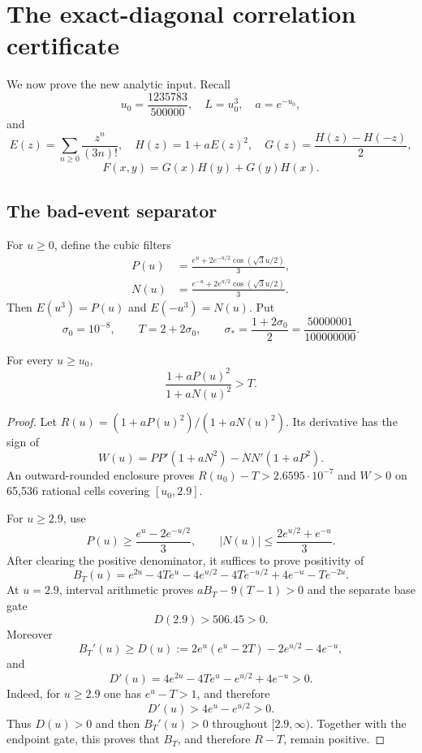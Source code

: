 \section{The exact-diagonal correlation certificate}\label{sec:exact}

We now prove the new analytic input.  Recall
\[
 u_0=\frac{1235783}{500000},\quad L=u_0^3,\quad a=e^{-u_0},
\]
and
\[
 E(z)=\sum_{n\ge0}\frac{z^n}{(3n)!},\quad
 H(z)=1+aE(z)^2,\quad G(z)=\frac{H(z)-H(-z)}2,
\]
\[
 F(x,y)=G(x)H(y)+G(y)H(x).
\]

\subsection{The bad-event separator}

For \(u\ge0\), define the cubic filters
\begin{align}
 P(u)&=\frac{e^u+2e^{-u/2}\cos(\sqrt3u/2)}3,\tag{4.1}\\
 N(u)&=\frac{e^{-u}+2e^{u/2}\cos(\sqrt3u/2)}3.\tag{4.2}
\end{align}
Then \(E(u^3)=P(u)\) and \(E(-u^3)=N(u)\).  Put
\[
 \sigma_0=10^{-8},\qquad T=2+2\sigma_0,\qquad
 \sigma_*=\frac{1+2\sigma_0}{2}=\frac{50000001}{100000000}.
 \tag{4.3}
\]

\begin{lemma}\label{lem:ratio}
For every \(u\ge u_0\),
\[
 \frac{1+aP(u)^2}{1+aN(u)^2}>T.
 \tag{4.4}
\]
\end{lemma}

\begin{proof}
Let \(R(u)=(1+aP(u)^2)/(1+aN(u)^2)\).  Its derivative has the sign of
\[
 W(u)=PP'(1+aN^2)-NN'(1+aP^2).
 \tag{4.5}
\]
An outward-rounded enclosure proves
\(R(u_0)-T>2.6595\cdot10^{-7}\) and \(W>0\) on 65,536 rational cells
covering \([u_0,2.9]\).

For \(u\ge2.9\), use
\[
 P(u)\ge\frac{e^u-2e^{-u/2}}3,\qquad
 |N(u)|\le\frac{2e^{u/2}+e^{-u}}3.
\]
After clearing the positive denominator, it suffices to prove positivity of
\[
 B_T(u)=e^{2u}-4Te^u-4e^{u/2}-4Te^{-u/2}+4e^{-u}-Te^{-2u}.
\]
At \(u=2.9\), interval arithmetic proves
\(aB_T-9(T-1)>0\) and the separate base gate
\[
 D(2.9)>506.45>0.
\]
Moreover
\[
 B_T'(u)\ge D(u):=2e^u(e^u-2T)-2e^{u/2}-4e^{-u},
\]
and
\[
 D'(u)=4e^{2u}-4Te^u-e^{u/2}+4e^{-u}>0.
\]
Indeed, for \(u\ge2.9\) one has \(e^u-T>1\), and therefore
\[
D'(u)>4e^u-e^{u/2}>0.
\]
Thus \(D(u)>0\) and then \(B_T'(u)>0\) throughout \([2.9,\infty)\).
Together with the endpoint gate, this proves that \(B_T\), and therefore
\(R-T\), remain positive.
\end{proof}

